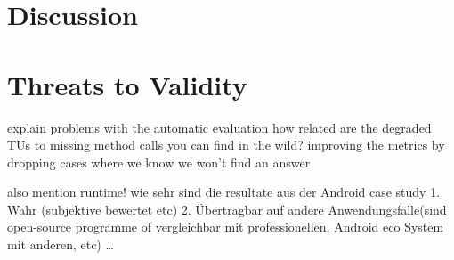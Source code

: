 \section{Discussion}

\section{Threats to Validity}

explain problems with the automatic evaluation
how related are the degraded TUs to missing method calls you can find in the wild?
improving the metrics by dropping cases where we know we won't find an answer

also mention runtime!
wie sehr sind die resultate aus der Android case study 1. Wahr (subjektive bewertet etc) 2. Übertragbar auf andere Anwendungsfälle(sind open-source programme of vergleichbar mit professionellen, Android eco System mit anderen, etc)
\ldots
